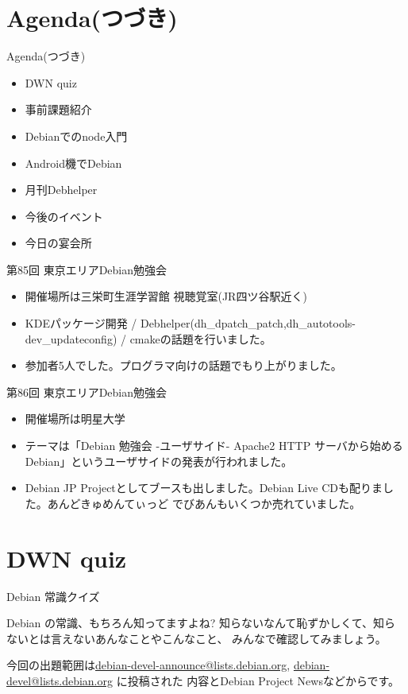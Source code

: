\section{Agenda(つづき)}
\begin{frame}{Agenda(つづき)}
\begin{itemize}
\item DWN quiz
\item 事前課題紹介
\item Debianでのnode入門
\item Android機でDebian
\item 月刊Debhelper
\item 今後のイベント
\item 今日の宴会所
\end{itemize}
\end{frame}
\begin{frame}{第85回 東京エリアDebian勉強会}
\begin{itemize}
\item 開催場所は三栄町生涯学習館 視聴覚室(JR四ツ谷駅近く)
\item KDEパッケージ開発 / Debhelper(dh\_dpatch\_patch,dh\_autotools-dev\_updateconfig) / cmakeの話題を行いました。
\item 参加者5人でした。プログラマ向けの話題でもり上がりました。
\end{itemize}
\end{frame}

\begin{frame}{第86回 東京エリアDebian勉強会}
\begin{itemize}
\item 開催場所は明星大学
\item テーマは「Debian 勉強会 -ユーザサイド- Apache2 HTTP サーバから始めるDebian」というユーザサイドの発表が行われました。
\item Debian JP Projectとしてブースも出しました。Debian Live CDも配りました。あんどきゅめんてぃっど でびあんもいくつか売れていました。
\end{itemize}
\end{frame}

\section{DWN quiz}
\begin{frame}{Debian 常識クイズ}

Debian の常識、もちろん知ってますよね?
知らないなんて恥ずかしくて、知らないとは言えないあんなことやこんなこと、
みんなで確認してみましょう。

今回の出題範囲は\url{debian-devel-announce@lists.debian.org},
\url{debian-devel@lists.debian.org} に投稿された
内容とDebian Project Newsなどからです。

\end{frame}

